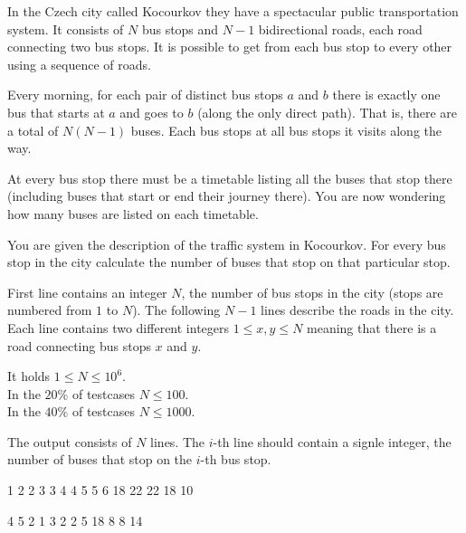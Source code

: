 

In the Czech city called Kocourkov they have a spectacular public transportation system.
It consists of $N$ bus stops and $N-1$ bidirectional roads, each road connecting two bus stops.
It is possible to get from each bus stop to every other using a sequence of roads.

Every morning, for each pair of distinct bus stops $a$ and $b$ there is exactly one bus
that starts at $a$ and goes to $b$ (along the only direct path).
That is, there are a total of $N(N-1)$ buses.
Each bus stops at all bus stops it visits along the way.

At every bus stop there must be a timetable listing all the buses that stop there (including
buses that start or end their journey there).
You are now wondering how many buses are listed on each timetable.


You are given the description of the traffic system in Kocourkov.
For every bus stop in the city calculate the number of buses that stop on that particular stop.


First line contains an integer $N$, the number of bus stops in the city (stops are numbered from $1$ to $N$).
The following $N-1$ lines describe the roads in the city.
Each line contains two different integers $1 \le x, y \le N$ meaning that there is a road connecting bus stops $x$ and $y$.

\bigskip
\noindent
It holds $1 \leq N \leq 10^6$.\\
In the $20\%$ of testcases $N \leq 100$.\\
In the $40\%$ of testcases $N \leq 1000$.


The output consists of $N$ lines. The $i$-th line should contain a signle integer, the number of buses that stop on the $i$-th bus stop.


1 2
2 3
3 4
4 5
5 6
18
22
22
18
10
\sampleEND

\bigskip

4 5
2 1
3 2
2 5
18
8
8
14
\sampleEND

